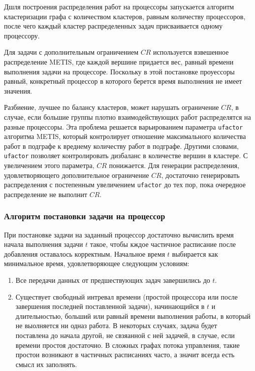 Дшля построения распределения работ на процессоры запускается алгоритм кластеризации графа с количеством кластеров, равным количеству процессоров, после чего каждый кластер распределенных задач присваивается одному процессору. 

Для задачи с дополнительным ограничением $CR$ используется взвешенное распределение METIS, где каждой вершине придается вес, равный времени выполнения задачи на процессоре. Поскольку в этой постановке проуессоры равный, конкретный процессор в которого берется время выполнения не имеет значения.

Разбиение, лучшее по балансу кластеров, может нарушать ограничение $CR$, в случае, если большие группы плотно взаимодействующих работ распределятся на разные процессоры. Эта проблема решается варьированием параметра \texttt{ufactor} алгоритма METIS, который контролирует отношение максимального количества работ в подграфе к вреднему количеству работ в подграфе. Другими словами, \texttt{ufactor} позволяет контролировать дизбаланс в количестве вершин в кластере. С увеличением этого параметра, $CR$ понижается. Для генерации распределения, удовлетворяющего дополнительное ограничение $CR$, достаточно генерировать распределения с постепенным увеличением \texttt{ufactor} до тех пор, пока очередное распределение не выполнит $CR$.

\subsubsection{Алгоритм постановки задачи на процессор} \label{gap_filling}
При постановке задачи на заданный процессор достаточно вычислить время начала выполнения задачи $t$ такое, чтобы кждое частичное расписание после добавления оставалось корректным. Начальное время $t$ выбирается как минимальное время, удовлетворяющее следующим условиям:
\begin{enumerate}
    \item Все передачи данных от предшествующих задач завершились до $t$.
    \item Существует свободный интревал времени (простой процессора или после завершения последней поставленной задачи), начинающийся в $t$ и длительностью, больший или равный времени выполнения работы, в который не выолняется ни одназ работа. В некоторых случаях, задача будет поставлена до начала другой, не свзяанной с ней задачей, в случае, если времени простоя достаточно. В сложных графах потока управления, такие простои возникают в частичных расписаниях часто, а значит всегда есть смысл их заполнять.
\end{enumerate}

